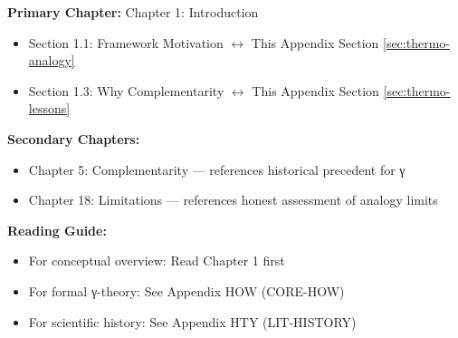 %
%

%
%
%
%

\begin{tcolorbox}[colback=purple!5!white, colframe=purple!75!black,
    title=Chapter Linkage]

\textbf{Primary Chapter:} Chapter 1: Introduction
\begin{itemize}[nosep]
\item Section 1.1: Framework Motivation $\leftrightarrow$ This Appendix Section \ref{sec:thermo-analogy}
\item Section 1.3: Why Complementarity $\leftrightarrow$ This Appendix Section \ref{sec:thermo-lessons}
\end{itemize}

\textbf{Secondary Chapters:}
\begin{itemize}[nosep]
\item Chapter 5: Complementarity --- references historical precedent for γ
\item Chapter 18: Limitations --- references honest assessment of analogy limits
\end{itemize}

\textbf{Reading Guide:}
\begin{itemize}[nosep]
\item For conceptual overview: Read Chapter 1 first
\item For formal γ-theory: See Appendix HOW (CORE-HOW)
\item For scientific history: See Appendix HTY (LIT-HISTORY)
\end{itemize}

\end{tcolorbox}


